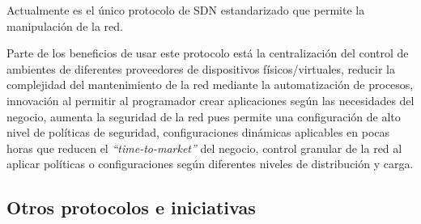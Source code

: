 \documentclass[10pt,journal,compsoc]{IEEEtran}
\begin{document}
Actualmente es el único protocolo de SDN estandarizado que permite la manipulación de la red.  

Parte de los beneficios de usar este protocolo está la centralización del control de ambientes de diferentes proveedores de dispositivos físicos/virtuales, reducir la complejidad del mantenimiento de la red mediante la automatización de procesos, innovación al permitir al programador crear aplicaciones según las necesidades del negocio, aumenta la seguridad de la red pues permite una configuración de alto nivel de políticas de seguridad, configuraciones dinámicas aplicables en pocas horas que reducen el \emph{``time-to-market''} del negocio, control granular de la red al aplicar políticas o configuraciones según diferentes niveles de distribución y carga.

\subsection{Otros protocolos e iniciativas}





%
%

\end{document}
